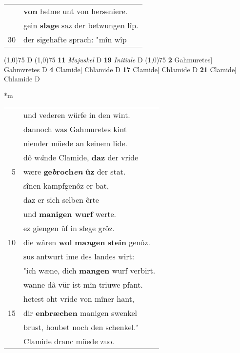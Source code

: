 \documentclass[8pt,a4paper,notitlepage]{article}
\begin{document}
\begin{table}[ht]
\begin{minipage}[t]{0.5\linewidth}
\begin{tabular}{rl}
 & \textbf{von} helme unt von herseniere.\\ 
 & gein \textbf{slage} saz der betwungen lîp.\\ 
30 & der sigehafte sprach: "mîn wîp\\ 
\end{tabular}
\scriptsize
\line(1,0){75} \newline
D \newline
\line(1,0){75} \newline
\textbf{11} \textit{Majuskel} D  \textbf{19} \textit{Initiale} D  \newline
\line(1,0){75} \newline
\textbf{2} Gahmuretes] Gahmvretes D \textbf{4} Clamide] Chlamide D \textbf{17} Clamide] Chlamide D \textbf{21} Clamide] Chlamide D \newline
\end{minipage}
\hspace{0.5cm}
\begin{minipage}[t]{0.5\linewidth}
\small
\begin{center}*m
\end{center}
\begin{tabular}{rl}
 & und vederen würfe in den wint.\\ 
 & dannoch was Gahmuretes kint\\ 
 & niender müede an keinem lide.\\ 
 & dô w\textit{â}nde Clamide, \textbf{daz} der vride\\ 
5 & wære \textbf{ge\textit{b}roch\textit{en}} \textbf{ûz} der stat.\\ 
 & sînen kampfgenôz er bat,\\ 
 & daz er sich selben êrte\\ 
 & und \textbf{manigen wurf} werte.\\ 
 & ez giengen ûf in slege grôz.\\ 
10 & die wâren \textbf{wol} \textbf{ma\textit{n}gen} \textbf{stein} genôz.\\ 
 & sus antwurt ime des landes wirt:\\ 
 & "ich wæne, dich \textbf{mangen} wurf verbirt.\\ 
 & wanne dâ vür ist mîn triuwe pfant.\\ 
 & hetest oht vride von mîner hant,\\ 
15 & dir \textbf{enbræchen} manigen swenkel\\ 
 & brust, houbet noch den schenkel."\\ 
 & Clamide dranc müede zuo.\\ 

\end{tabular}
\end{minipage}
\end{table}
\end{document}
